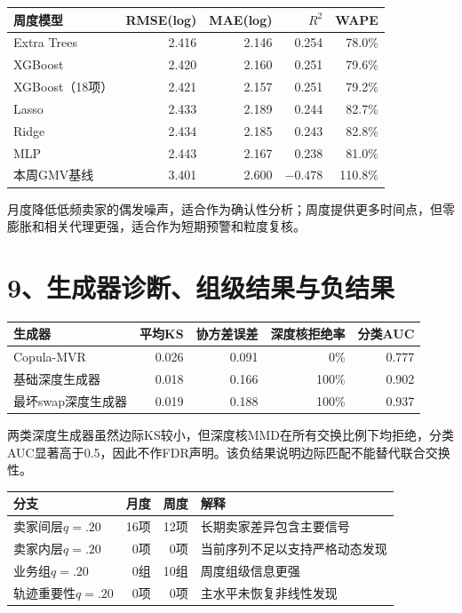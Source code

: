 \documentclass[UTF8,12pt,a4paper]{ctexart}
\begin{document}
\begin{center}
\scriptsize
\begin{tabular}{lrrrr}
\toprule
周度模型 & RMSE(log) & MAE(log) & $R^2$ & WAPE\\
\midrule
Extra Trees & 2.416 & 2.146 & 0.254 & 78.0\%\\
XGBoost & 2.420 & 2.160 & 0.251 & 79.6\%\\
XGBoost（18项） & 2.421 & 2.157 & 0.251 & 79.2\%\\
Lasso & 2.433 & 2.189 & 0.244 & 82.7\%\\
Ridge & 2.434 & 2.185 & 0.243 & 82.8\%\\
MLP & 2.443 & 2.167 & 0.238 & 81.0\%\\
本周GMV基线 & 3.401 & 2.600 & $-0.478$ & 110.8\%\\
\bottomrule
\end{tabular}
\end{center}

月度降低低频卖家的偶发噪声，适合作为确认性分析；周度提供更多时间点，但零膨胀和相关代理更强，适合作为短期预警和粒度复核。

\newpage
\section*{9、生成器诊断、组级结果与负结果}

\begin{center}
\scriptsize
\begin{tabular}{lrrrr}
\toprule
生成器 & 平均KS & 协方差误差 & 深度核拒绝率 & 分类AUC\\
\midrule
Copula-MVR & 0.026 & 0.091 & 0\% & 0.777\\
基础深度生成器 & 0.018 & 0.166 & 100\% & 0.902\\
最坏swap深度生成器 & 0.019 & 0.188 & 100\% & 0.937\\
\bottomrule
\end{tabular}
\end{center}

两类深度生成器虽然边际KS较小，但深度核MMD在所有交换比例下均拒绝，分类AUC显著高于0.5，因此不作FDR声明。该负结果说明边际匹配不能替代联合交换性。

\begin{center}
\scriptsize
\begin{tabular}{lrrp{6.0cm}}
\toprule
分支 & 月度 & 周度 & 解释\\
\midrule
卖家间层$q=.20$ & 16项 & 12项 & 长期卖家差异包含主要信号\\
卖家内层$q=.20$ & 0项 & 0项 & 当前序列不足以支持严格动态发现\\
业务组$q=.20$ & 0组 & 10组 & 周度组级信息更强\\
轨迹重要性$q=.20$ & 0项 & 0项 & 主水平未恢复非线性发现\\
\bottomrule
\end{tabular}
\end{center}
\end{document}
